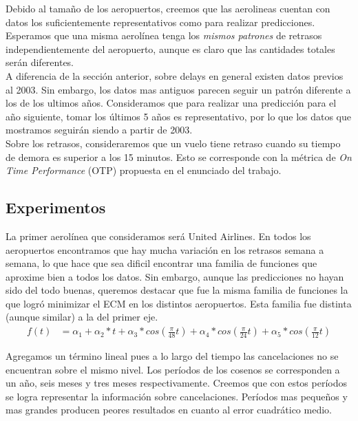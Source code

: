 Debido al tamaño de los aeropuertos, creemos que las aerolineas cuentan con datos los suficientemente representativos como para realizar predicciones. Esperamos que una misma aerolínea tenga los \textit{mismos patrones} de retrasos independientemente del aeropuerto, aunque es claro que las cantidades totales serán diferentes. \\

A diferencia de la sección anterior, sobre delays en general existen datos previos al 2003. Sin embargo, los datos mas antiguos parecen seguir un patrón diferente a los de los ultimos años. Consideramos que para realizar una predicción para el año siguiente, tomar los últimos 5 años es representativo, por lo que los datos que mostramos seguirán siendo a partir de 2003. \\

Sobre los retrasos, consideraremos que un vuelo tiene retraso cuando su tiempo de demora es superior a los 15 minutos. Esto se corresponde con la métrica de \textit{On Time Performance} (OTP) propuesta en el enunciado del trabajo. \\

\subsection{Experimentos}

La primer aerolínea que consideramos será United Airlines. En todos los aeropuertos encontramos que hay mucha variación en los retrasos semana a semana, lo que hace que sea dificil encontrar una familia de funciones que aproxime bien a todos los datos. Sin embargo, aunque las predicciones no hayan sido del todo buenas, queremos destacar que fue la misma familia de funciones la que logró minimizar el ECM en los distintos aeropuertos. Esta familia fue distinta (aunque similar) a la del primer eje.\\

\begin{align}
f(t) &= \alpha_1 + \alpha_2 * t + \alpha_3 * cos(\frac{\pi}{48} t) + \alpha_4 * cos(\frac{\pi}{24} t) + \alpha_5 * cos(\frac{\pi}{12} t)
\end{align}

Agregamos un término lineal pues a lo largo del tiempo las cancelaciones no se encuentran sobre el mismo nivel. Los períodos de los cosenos se corresponden a un año, seis meses y tres meses respectivamente. Creemos que con estos períodos se logra representar la información sobre cancelaciones. Períodos mas pequeños y mas grandes producen peores resultados en cuanto al error cuadrático medio. \\

